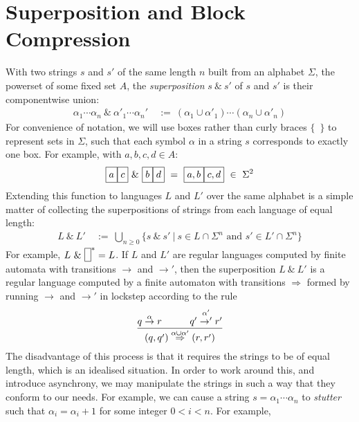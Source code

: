 \documentclass[a4paper,11pt]{article}
\newcommand{\vph}[1]{\vphantom{#1}}
\newcommand{\sta}[2]{\stackrel{#1}{#2}}
\begin{document}
\section{Superposition and Block Compression}
With two strings $s$ and $s'$ of the same length $n$
built from an alphabet $\Sigma$, the powerset of some fixed set $A$,
the \textit{superposition} $s ~\&~ s'$ of $s$ and $s'$ is their componentwise 
union:
\begin{align*}
\alpha_1\cdots\alpha_n \ \&\ 
\alpha'_1\cdots\alpha_n' & \ :=\
(\alpha_1\cup\alpha'_1)\cdots(\alpha_n\cup\alpha'_n)
\end{align*}
For convenience of notation, we will use boxes rather than curly braces 
$\{$~$\}$ to represent sets in $\Sigma$, such that each symbol $\alpha$ in a 
string $s$ corresponds to exactly one box. For example, with $a, b, c, d \in A$:
\begin{align*}
\fbox{$a\vph{,'}$}\fbox{$c\vph{,'}$} \ \& \ 
\fbox{$b\vph{,'}$}\fbox{$d\vph{,'}$} \ = \
\fbox{$a, b\vph{,'}$}\fbox{$c, d\vph{,'}$} \ \in\ \Sigma^2
\end{align*}
Extending this function to languages $L$ and $L'$ over the same alphabet is a 
simple matter of 
collecting the superpositions of strings from each language of equal length: 
\begin{align*}
L ~\&~ L' & \ :=\ \bigcup_{n\geq 0}
\{s~\&~s'\ | \ s\in L\cap \Sigma^n\mbox{ and }s'\in L'\cap \Sigma^n\}
\end{align*}
For example, $L ~\&~ \fbox{\vph{'}}^\ast = L$.
If $L$ and $L'$ are regular languages computed by finite automata
with transitions $\to$ and $\to'$, then the superposition $L~\&~ L'$ is
a regular language computed by a finite automaton with transitions
$\Rightarrow$
formed by running $\to$ and $\to'$ in lockstep
according to the rule 
\begin{align*}
\frac{q \sta{\alpha}{\to} r   \hspace{.4in} q' \sta{\alpha'}{\to'} r'}{
	(q,q') \sta{\alpha\cup\alpha'}{\Rightarrow} (r,r')}
\end{align*}
The disadvantage of this process is that it requires the strings to be of equal 
length, which is an idealised situation. In order to work around this, and 
introduce asynchrony, we may 
manipulate the strings in such a way that they conform to our needs. For 
example, we 
can cause a string $s=\alpha_1\cdots\alpha_n$ to \textit{stutter} such that 
$\alpha_i=\alpha_i+1$ for some integer $0 < i < n$. For example, 
\fbox{$a\vph{'}$}\fbox{$a\vph{'}$}\fbox{$a\vph{'}$}\fbox{$c\vph{'}$}\fbox{$c\vph{'}$}
\end{document}
